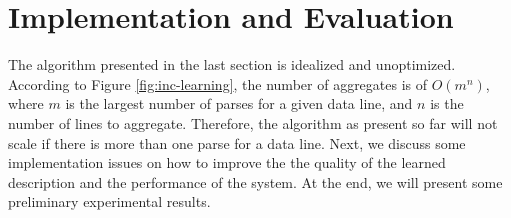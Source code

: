 \section{Implementation and Evaluation}
\label{sec:imp}
The algorithm presented in the last section is idealized and unoptimized.
According to Figure \ref{fig:inc-learning}, the number of aggregates is of 
$O(m ^ n)$, where $m$ is the largest number of parses for a given data line, 
and $n$ is the number of lines to aggregate.
Therefore, the algorithm as present so far
will not scale if there is more than one parse for a data line. 
Next, we discuss some implementation issues on how to
improve the the quality of the learned description and the performance of
the system. At the end, we will present some preliminary experimental results.


